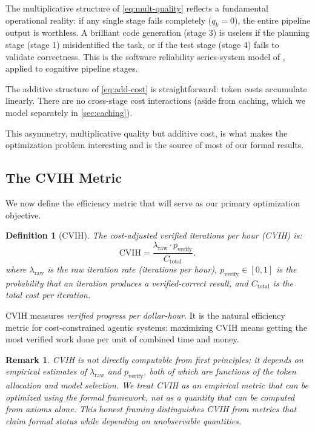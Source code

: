 \documentclass[11pt, a4paper, copyright]{googledeepmind}
\newtheorem{definition}{Definition}[section]
\newtheorem*{remark}{Remark}
\begin{document}
The multiplicative structure of \cref{eq:mult-quality} reflects a fundamental operational reality: if any single stage fails completely ($q_k = 0$), the entire pipeline output is worthless. A brilliant code generation (stage 3) is useless if the planning stage (stage 1) misidentified the task, or if the test stage (stage 4) fails to validate correctness. This is the software reliability series-system model of \citet{barlow1975}, applied to cognitive pipeline stages.

The additive structure of \cref{eq:add-cost} is straightforward: token costs accumulate linearly. There are no cross-stage cost interactions (aside from caching, which we model separately in \cref{sec:caching}).

This asymmetry, multiplicative quality but additive cost, is what makes the optimization problem interesting and is the source of most of our formal results.

\subsection{The CVIH Metric}

We now define the efficiency metric that will serve as our primary optimization objective.

\begin{definition}[CVIH]\label{def:cvih}
The \emph{cost-adjusted verified iterations per hour} (CVIH) is:
\begin{equation}\label{eq:cvih-def}
    \text{CVIH} = \frac{\lambda_{\text{raw}} \cdot p_{\text{verify}}}{C_{\text{total}}},
\end{equation}
where $\lambda_{\text{raw}}$ is the raw iteration rate (iterations per hour), $p_{\text{verify}} \in [0,1]$ is the probability that an iteration produces a verified-correct result, and $C_{\text{total}}$ is the total cost per iteration.
\end{definition}

CVIH measures \emph{verified progress per dollar-hour}. It is the natural efficiency metric for cost-constrained agentic systems: maximizing CVIH means getting the most verified work done per unit of combined time and money.

\begin{remark}
CVIH is not directly computable from first principles; it depends on empirical estimates of $\lambda_{\text{raw}}$ and $p_{\text{verify}}$, both of which are functions of the token allocation and model selection. We treat CVIH as an empirical metric that can be \emph{optimized} using the formal framework, not as a quantity that can be computed from axioms alone. This honest framing distinguishes CVIH from metrics that claim formal status while depending on unobservable quantities.
\end{remark}
\end{document}
